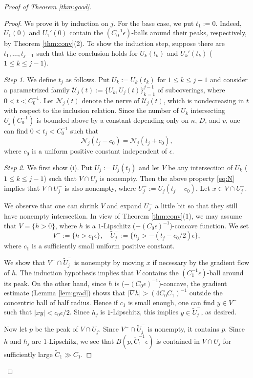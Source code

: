 \documentclass[a4paper,12pt]{amsart}
\theoremstyle{plain}
\theoremstyle{definition}
\numberwithin{thm}{section}
\numberwithin{equation}{section}
\newcommand{\step}[1]{\medskip\noindent\textit{#1.}}
\begin{document}
\begin{proof}[Proof of Theorem \ref{thm:good}]
\begin{proof}
We prove it by induction on $j$.
For the base case, we put $t_1:=0$.
Indeed, $U_1(0)$ and $U_1'(0)$ contain the $(C_0^{-1}\epsilon)$-balls around their peaks, respectively, by Theorem \ref{thm:conv}(2).
To show the induction step, suppose there are $t_1,\dots,t_{j-1}$ such that the conclusion holds for $U_k(t_k)$ and $U_k'(t_k)$ ($1\le k\le j-1$).

\step{Step 1}
We define $t_j$ as follows.
Put $U_k:=U_k(t_k)$ for $1\le k\le j-1$ and consider a parametrized family $\mathcal U_j(t):=\{U_k,U_j(t)\}_{k=1}^{j-1}$ of subcoverings, where $0<t<C_0^{-1}$.
Let $\mathcal N_j(t)$ denote the nerve of $\mathcal U_j(t)$, which is nondecreasing in $t$ with respect to the inclusion relation.
Since the number of $U_k$ intersecting $U_j(C_0^{-1})$ is bounded above by a constant depending only on $n$, $D$, and $v$, one can find $0<t_j<C_0^{-1}$ such that
\begin{equation}\label{eq:N}
\mathcal N_j(t_j-c_0)=\mathcal N_j(t_j+c_0),
\end{equation}
where $c_0$ is a uniform positive constant independent of $\epsilon$.

\step{Step 2}
We first show (i).
Put $U_j:=U_j(t_j)$ and let $V$ be any intersection of $U_k$ ($1\le k\le j-1$) such that $V\cap U_j$ is nonempty.
Then the above property \eqref{eq:N} implies that $V\cap U_j^{-}$ is also nonempty, where $U_j^-:=U_j(t_j-c_0)$.
Let $x\in V\cap U_j^-$.

We observe that one can shrink $V$ and expand $U_j^-$ a little bit so that they still have nonempty intersection.
In view of Theorem \ref{thm:conv}(1), we may assume that $V=\{h>0\}$, where $h$ is a $1$-Lipschitz ($-(C_0\epsilon)^{-1}$)-concave function.
We set
\[V^-:=\{h>c_1\epsilon\},\quad\tilde U_j^-:=\{h_j>-(t_j-c_0/2)\epsilon\},\]
where $c_1$ is a sufficiently small uniform positive constant.

We show that $V^-\cap\tilde U_j^-$ is nonempty by moving $x$ if necessary by the gradient flow of $h$.
The induction hypothesis implies that $V$ contains the $(C_1^{-1}\epsilon)$-ball around its peak.
On the other hand, since $h$ is ($-(C_0\epsilon)^{-1}$)-concave, the gradient estimate (Lemma \ref{lem:grad}) shows that $|\nabla h|>(4C_0C_1)^{-1}$ outside the concentric ball of half radius.
Hence if $c_1$ is small enough, one can find $y\in V^-$ such that $|xy|<c_0\epsilon/2$.
Since $h_j$ is $1$-Lipschitz, this implies $y\in\tilde U_j^-$, as desired.

Now let $p$ be the peak of $V\cap U_j$.
Since $V^-\cap\tilde U_j^-$ is nonempty, it contains $p$.
Since $h$ and $h_j$ are $1$-Lipschitz, we see that $B(p,\tilde C_1^{-1}\epsilon)$ is contained in $V\cap U_j$ for sufficiently large $\tilde C_1\gg C_1$.


\end{proof}
\end{proof}
\end{document}

